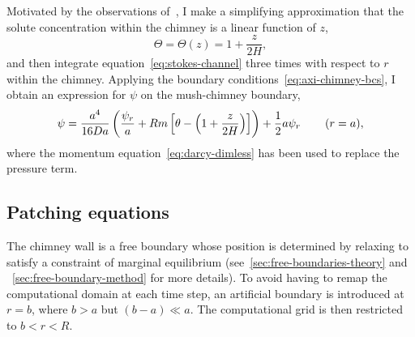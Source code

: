 \documentclass[11pt]{proc}
\begin{document}
Motivated by the observations of~\citet*{rees-jones-worster-13}, I make a simplifying approximation that the solute concentration within the chimney is a linear function of $z$,
\begin{equation}
\Theta = \Theta(z) = 1 + \frac{z}{2H},
\end{equation}
and then integrate equation~\eqref{eq:stokes-channel} three times with respect to $r$ within the chimney. Applying the boundary conditions~\eqref{eq:axi-chimney-bcs}, I obtain an expression for $\psi$ on the mush-chimney boundary,
\begin{equation}
\psi = \frac{a^4}{16 Da} \left(\frac{\psi_r}{a} + Rm \left[ \theta -  \left( 1 + \frac{z}{2H} \right) \right] \right)   + \frac{1}{2} a \psi_r   \hspace{5ex} (r=a),
\end{equation}
where the momentum equation~\eqref{eq:darcy-dimless} has been used to replace the pressure term.

\subsection{Patching equations}
\label{sec:patching-equations}
The chimney wall is a free boundary whose position is determined by relaxing to satisfy a constraint of marginal equilibrium (see~\autoref{sec:free-boundaries-theory} and ~\autoref{sec:free-boundary-method} for more details). To avoid having to remap the computational domain at each time step, an artificial boundary is introduced at $r=b$, where $b > a$ but $(b-a) \ll a$. The computational grid is then restricted to $b < r < R$. 
\end{document}
